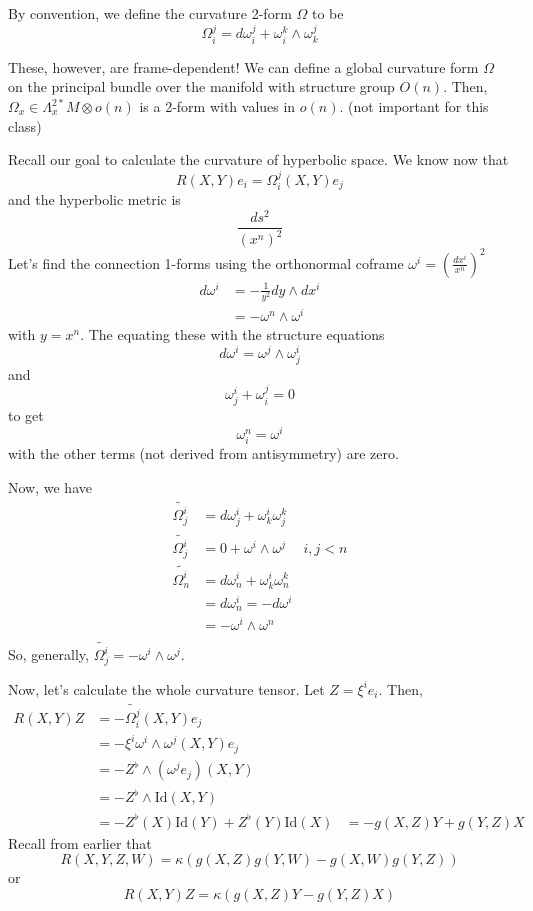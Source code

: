 \documentclass[../main.tex]{subfiles}
\begin{document}
By convention, we define the curvature 2-form $\Omega$ to be
\begin{equation}
    \Omega_i^j = d\omega_i^j + \omega_i^k\wedge\omega_k^j
\end{equation}

These, however, are frame-dependent! We can define a global curvature form
$\Omega$ on the principal bundle over the manifold with structure group $O(n)$.
Then, $\Omega_x\in \Lambda^{2*}_xM\otimes o(n)$ is a 2-form with values in
$o(n)$. (not important for this class)

Recall our goal to calculate the curvature of hyperbolic space. We know now that 
\begin{equation}
    R(X,Y)e_i = \Omega_i^j(X,Y)e_j
\end{equation}
and the hyperbolic metric is
\begin{equation}
    \frac{ds^2}{(x^n)^2}
\end{equation}
Let's find the connection 1-forms using the orthonormal coframe $\omega^i =
(\frac{dx^i}{x^n})^2$
\[
\begin{aligned}
    d\omega^i &= -\frac{1}{y^2}dy\wedge dx^i\\
    &= -\omega^n\wedge\omega^i
\end{aligned}
\]
with $y=x^n$. The equating these with the structure equations
\begin{equation}
    d\omega^i = \omega^j\wedge\omega_j^i
\end{equation}
and
\begin{equation}
    \omega^i_j+\omega_i^j =0
\end{equation}
to get
\[
    \omega_i^n = \omega^i
\]
with the other terms (not derived from antisymmetry) are zero.

Now, we have
\[
\begin{aligned}
    \tilde{\Omega_j^i} &= d\omega^i_j + \omega^i_k\omega^k_j\\
    \tilde{\Omega_j^i} &= 0 + \omega^i\wedge\omega^j &i,j<n\\
    \tilde{\Omega_n^i} &= d\omega_n^i + \omega^i_k\omega^k_n\\
    &= d\omega_n^i = -d\omega^i\\
    &= -\omega^i\wedge\omega^n\\
\end{aligned}
\]
So, generally, $\tilde{\Omega_j^i} = -\omega^i\wedge\omega^j$.

Now, let's calculate the whole curvature tensor. Let $Z=\xi^ie_i$. Then,
\[
\begin{aligned}
    R(X,Y)Z &= -\tilde{\Omega_i^j}(X,Y)e_j\\
    &= -\xi^i\omega^i\wedge\omega^j (X,Y)e_j\\
    &= -Z^{\flat}\wedge(\omega^je_j)(X,Y)\\
    &= -Z^{\flat}\wedge\text{Id}(X,Y)\\
    &= -Z^{\flat}(X)\text{Id}(Y) + Z^{\flat}(Y)\text{Id}(X)
    &= -g(X,Z)Y + g(Y,Z)X
\end{aligned}
\]
Recall from earlier that
\[
    R(X,Y,Z,W) = \kappa(g(X,Z)g(Y,W) - g(X,W)g(Y,Z))
\]
or
\[
    R(X,Y)Z =\kappa(g(X,Z)Y - g(Y,Z)X)
\]
\end{document}
